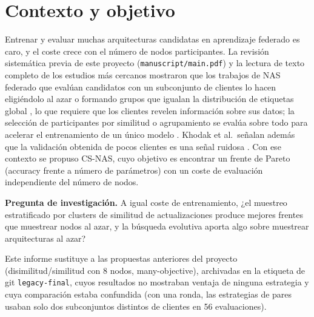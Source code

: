 \documentclass[11pt,a4paper]{article}
\begin{document}
\begin{abstract}
\end{abstract}

\section{Contexto y objetivo}
Entrenar y evaluar muchas arquitecturas candidatas en aprendizaje federado es caro, y el coste crece con el número de nodos participantes. La revisión sistemática previa de este proyecto (\texttt{manuscript/main.pdf}) y la lectura de texto completo de los estudios más cercanos mostraron que los trabajos de NAS federado que evalúan candidatos con un subconjunto de clientes lo hacen eligiéndolo al azar \cite{zhu2021realtime} o formando grupos que igualan la distribución de etiquetas global \cite{yuan2022resourceaware}, lo que requiere que los clientes revelen información sobre sus datos; la selección de participantes por similitud o agrupamiento se evalúa sobre todo para acelerar el entrenamiento de un único modelo \cite{bhope2023flips}. Khodak et al.\ señalan además que la validación obtenida de pocos clientes es una señal ruidosa \cite{khodak2021federated}. Con ese contexto se propuso CS-NAS, cuyo objetivo es encontrar un frente de Pareto (accuracy frente a número de parámetros) con un coste de evaluación independiente del número de nodos.

\textbf{Pregunta de investigación.} A igual coste de entrenamiento, ¿el muestreo estratificado por clusters de similitud de actualizaciones produce mejores frentes que muestrear nodos al azar, y la búsqueda evolutiva aporta algo sobre muestrear arquitecturas al azar?

Este informe sustituye a las propuestas anteriores del proyecto (disimilitud/similitud con 8 nodos, many-objective), archivadas en la etiqueta de git \texttt{legacy-final}, cuyos resultados no mostraban ventaja de ninguna estrategia y cuya comparación estaba confundida (con una ronda, las estrategias de pares usaban solo dos subconjuntos distintos de clientes en 56 evaluaciones).
\end{document}
